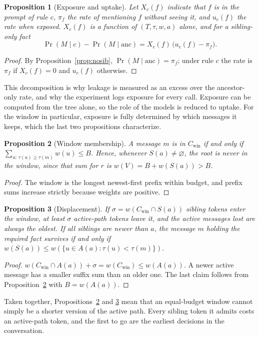\documentclass[conference]{IEEEtran}
\newtheorem{proposition}{Proposition}
\theoremstyle{definition}
\newcommand{\A}{A(a)}
\newcommand{\Sib}{S(a)}
\newcommand{\anc}{\mathrm{anc}}
\newcommand{\win}{\mathrm{win}}
\begin{document}
\begin{proposition}[Exposure and uptake]\label{prop:decomp}
Let $X_c(f)$ indicate that $f$ is in the prompt of rule $c$, $\pi_f$ the rate of mentioning $f$ without seeing it, and $u_c(f)$ the rate when exposed. $X_c(f)$ is a function of $(T,\tau,w,a)$ alone, and for a sibling-only fact
\[\Pr(M\mid c)-\Pr(M\mid\anc)=X_c(f)\,\bigl(u_c(f)-\pi_f\bigr).\]
\end{proposition}
\begin{proof}
By Proposition~\ref{prop:nosib}, $\Pr(M\mid\anc)=\pi_f$; under rule $c$ the rate is $\pi_f$ if $X_c(f)=0$ and $u_c(f)$ otherwise.
\end{proof}

This decomposition is why leakage is measured as an excess over the ancestor-only rate, and why the experiment logs exposure for every call. Exposure can be computed from the tree alone, so the role of the models is reduced to uptake. For the window in particular, exposure is fully determined by which messages it keeps, which the last two propositions characterize.

\begin{proposition}[Window membership]\label{prop:window}
A message $m$ is in $C_\win$ if and only if $\sum_{u:\,\tau(u)\ge\tau(m)}w(u)\le B$. Hence, whenever $\Sib\neq\varnothing$, the root is never in the window, since that sum for $r$ is $w(V)=B+w(\Sib)>B$.
\end{proposition}
\begin{proof}
The window is the longest newest-first prefix within budget, and prefix sums increase strictly because weights are positive.
\end{proof}

\begin{proposition}[Displacement]\label{prop:displace}
If $\sigma=w(C_\win\cap\Sib)$ sibling tokens enter the window, at least $\sigma$ active-path tokens leave it, and the active messages lost are always the oldest. If all siblings are newer than $a$, the message $m$ holding the required fact survives if and only if $w(\Sib)\le w(\{u\in\A:\tau(u)<\tau(m)\})$.
\end{proposition}
\begin{proof}
$w(C_\win\cap\A)+\sigma=w(C_\win)\le w(\A)$. A newer active message has a smaller suffix sum than an older one. The last claim follows from Proposition~\ref{prop:window} with $B=w(\A)$.
\end{proof}

Taken together, Propositions~\ref{prop:window} and \ref{prop:displace} mean that an equal-budget window cannot simply be a shorter version of the active path. Every sibling token it admits costs an active-path token, and the first to go are the earliest decisions in the conversation.
\end{document}
